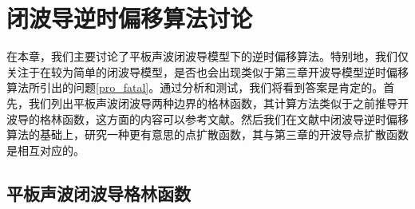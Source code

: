 
\chapter{闭波导逆时偏移算法讨论}
\label{chapter:ref3}
在本章，我们主要讨论了平板声波闭波导模型下的逆时偏移算法。特别地，我们仅关注于在较为简单的闭波导模型，是否也会出现类似于第三章开波导模型逆时偏移算法所引出的问题\ref{pro_fatal}。通过分析和测试，我们将看到答案是肯定的。首先，我们列出平板声波闭波导两种边界的格林函数，其计算方法类似于之前推导开波导的格林函数，这方面的内容可以参考文献\cite{ch_cw,Xu1990The,Arens2011Direct}。然后我们在文献\cite{ch_cw}中闭波导逆时偏移算法的基础上，研究一种更有意思的点扩散函数，其与第三章的开波导点扩散函数是相互对应的。
\section{平板声波闭波导格林函数}
